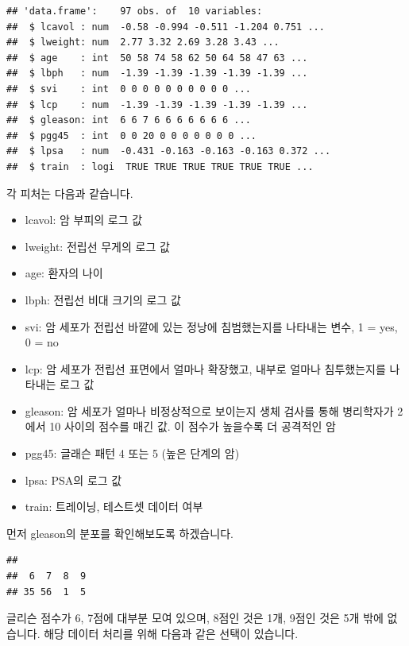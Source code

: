 \documentclass[12pt,]{book}
\newenvironment{Shaded}{\begin{snugshade}}{\end{snugshade}}
\newcommand{\KeywordTok}[1]{\textcolor[rgb]{0.13,0.29,0.53}{\textbf{#1}}}
\newcommand{\NormalTok}[1]{#1}
\newcommand{\OperatorTok}[1]{\textcolor[rgb]{0.81,0.36,0.00}{\textbf{#1}}}
\providecommand{\tightlist}{%
  \setlength{\itemsep}{0pt}\setlength{\parskip}{0pt}}
\begin{document}
\begin{verbatim}
## 'data.frame':    97 obs. of  10 variables:
##  $ lcavol : num  -0.58 -0.994 -0.511 -1.204 0.751 ...
##  $ lweight: num  2.77 3.32 2.69 3.28 3.43 ...
##  $ age    : int  50 58 74 58 62 50 64 58 47 63 ...
##  $ lbph   : num  -1.39 -1.39 -1.39 -1.39 -1.39 ...
##  $ svi    : int  0 0 0 0 0 0 0 0 0 0 ...
##  $ lcp    : num  -1.39 -1.39 -1.39 -1.39 -1.39 ...
##  $ gleason: int  6 6 7 6 6 6 6 6 6 6 ...
##  $ pgg45  : int  0 0 20 0 0 0 0 0 0 0 ...
##  $ lpsa   : num  -0.431 -0.163 -0.163 -0.163 0.372 ...
##  $ train  : logi  TRUE TRUE TRUE TRUE TRUE TRUE ...
\end{verbatim}

각 피처는 다음과 같습니다.

\begin{itemize}
\tightlist
\item
  lcavol: 암 부피의 로그 값
\item
  lweight: 전립선 무게의 로그 값
\item
  age: 환자의 나이
\item
  lbph: 전립선 비대 크기의 로그 값
\item
  svi: 암 세포가 전립선 바깥에 있는 정낭에 침범했는지를 나타내는 변수, 1 = yes, 0 = no
\item
  lcp: 암 세포가 전립선 표면에서 얼마나 확장했고, 내부로 얼마나 침투했는지를 나타내는 로그 값
\item
  gleason: 암 세포가 얼마나 비정상적으로 보이는지 생체 검사를 통해 병리학자가 2에서 10 사이의 점수를 매긴 값. 이 점수가 높을수록 더 공격적인 암
\item
  pgg45: 글래슨 패턴 4 또는 5 (높은 단계의 암)
\item
  lpsa: PSA의 로그 값
\item
  train: 트레이닝, 테스트셋 데이터 여부
\end{itemize}

먼저 gleason의 분포를 확인해보도록 하겠습니다.

\begin{Shaded}
\end{Shaded}

\begin{verbatim}
## 
##  6  7  8  9 
## 35 56  1  5
\end{verbatim}

글리슨 점수가 6, 7점에 대부분 모여 있으며, 8점인 것은 1개, 9점인 것은 5개 밖에 없습니다. 해당 데이터 처리를 위해 다음과 같은 선택이 있습니다.
\end{document}
